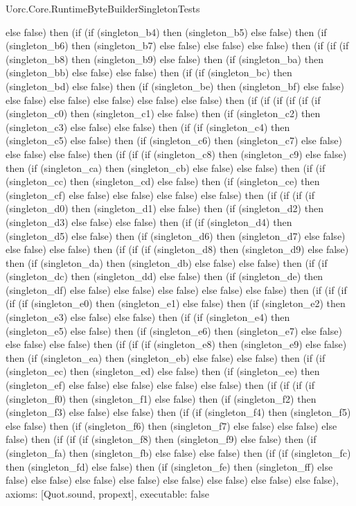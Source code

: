 \begin{lexlean}{Uorc.Core.RuntimeByteBuilderSingletonTests}
\begin{semanticmodule}
{else false) then (if (if (singleton_b4) then (singleton_b5) else false) then (if (singleton_b6) then (singleton_b7) else false) else false) else false) then (if (if (if (singleton_b8) then (singleton_b9) else false) then (if (singleton_ba) then (singleton_bb) else false) else false) then (if (if (singleton_bc) then (singleton_bd) else false) then (if (singleton_be) then (singleton_bf) else false) else false) else false) else false) else false) else false) then (if (if (if (if (if (if (singleton_c0) then (singleton_c1) else false) then (if (singleton_c2) then (singleton_c3) else false) else false) then (if (if (singleton_c4) then (singleton_c5) else false) then (if (singleton_c6) then (singleton_c7) else false) else false) else false) then (if (if (if (singleton_c8) then (singleton_c9) else false) then (if (singleton_ca) then (singleton_cb) else false) else false) then (if (if (singleton_cc) then (singleton_cd) else false) then (if (singleton_ce) then (singleton_cf) else false) else false) else false) else false) then (if (if (if (if (singleton_d0) then (singleton_d1) else false) then (if (singleton_d2) then (singleton_d3) else false) else false) then (if (if (singleton_d4) then (singleton_d5) else false) then (if (singleton_d6) then (singleton_d7) else false) else false) else false) then (if (if (if (singleton_d8) then (singleton_d9) else false) then (if (singleton_da) then (singleton_db) else false) else false) then (if (if (singleton_dc) then (singleton_dd) else false) then (if (singleton_de) then (singleton_df) else false) else false) else false) else false) else false) then (if (if (if (if (if (singleton_e0) then (singleton_e1) else false) then (if (singleton_e2) then (singleton_e3) else false) else false) then (if (if (singleton_e4) then (singleton_e5) else false) then (if (singleton_e6) then (singleton_e7) else false) else false) else false) then (if (if (if (singleton_e8) then (singleton_e9) else false) then (if (singleton_ea) then (singleton_eb) else false) else false) then (if (if (singleton_ec) then (singleton_ed) else false) then (if (singleton_ee) then (singleton_ef) else false) else false) else false) else false) then (if (if (if (if (singleton_f0) then (singleton_f1) else false) then (if (singleton_f2) then (singleton_f3) else false) else false) then (if (if (singleton_f4) then (singleton_f5) else false) then (if (singleton_f6) then (singleton_f7) else false) else false) else false) then (if (if (if (singleton_f8) then (singleton_f9) else false) then (if (singleton_fa) then (singleton_fb) else false) else false) then (if (if (singleton_fc) then (singleton_fd) else false) then (if (singleton_fe) then (singleton_ff) else false) else false) else false) else false) else false) else false) else false) else false),
  axioms: [Quot.sound, propext],
  executable: false
}


\end{semanticmodule}
\end{lexlean}

